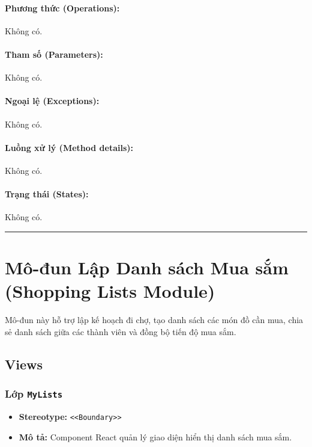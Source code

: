 \documentclass[12pt,a4paper]{article}
\begin{document}
\paragraph{Phương thức (Operations):}
Không có.

\paragraph{Tham số (Parameters):}
Không có.

\paragraph{Ngoại lệ (Exceptions):}
Không có.

\paragraph{Luồng xử lý (Method details):}
Không có.

\paragraph{Trạng thái (States):}
Không có.

\vskip 0.5cm
\noindent\rule{\textwidth}{0.5pt}
\vskip 0.5cm

\section{Mô-đun Lập Danh sách Mua sắm (Shopping Lists Module)}


Mô-đun này hỗ trợ lập kế hoạch đi chợ, tạo danh sách các món đồ cần mua, chia sẻ danh sách giữa các thành viên và đồng bộ tiến độ mua sắm.

\subsection{Views}


\subsubsection{Lớp \texttt{MyLists}}

\begin{itemize}[leftmargin=*]
    \item \textbf{Stereotype:} \texttt{\textless{}\textless{}Boundary\textgreater{}\textgreater{}}
    \item \textbf{Mô tả:} Component React quản lý giao diện hiển thị danh sách mua sắm.
\end{itemize}
\end{document}
